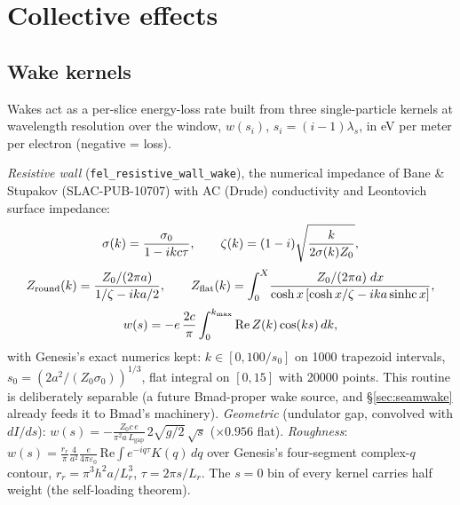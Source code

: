 \documentclass[11pt]{article}
\newcommand{\code}[1]{\texttt{#1}}
\begin{document}
\section{Collective effects}\label{sec:collective}

\subsection{Wake kernels}\label{sec:wakes}

Wakes act as a per-slice energy-loss rate built from three single-particle kernels at
wavelength resolution over the window, $w(s_i)$, $s_i = (i-1)\lambda_s$, in eV per
meter per electron (negative = loss).

\emph{Resistive wall} (\code{fel\_resistive\_wall\_wake}), the numerical impedance of
Bane \& Stupakov (SLAC-PUB-10707) with AC (Drude) conductivity and Leontovich surface
impedance:
\begin{gather}
  \sigma(k) = \frac{\sigma_0}{1 - i k c\tau}, \qquad
  \zeta(k) = (1-i)\sqrt{\frac{k}{2\sigma(k) Z_0}}, \notag\\[2pt]
  Z_{\mathrm{round}}(k) = \frac{Z_0/(2\pi a)}{1/\zeta - i k a/2}, \qquad
  Z_{\mathrm{flat}}(k) = \int_0^{X}\!
     \frac{Z_0/(2\pi a)\; dx}{\cosh x\,[\cosh x/\zeta - i k a\,\mathrm{sinhc}\,x]},
     \label{eq:bszk}\\[2pt]
  w(s) = -e\,\frac{2c}{\pi}\int_0^{k_{\max}} \mathrm{Re}\,Z(k)\cos(k s)\, dk,
  \label{eq:bsws}
\end{gather}
with Genesis's exact numerics kept: $k \in [0, 100/s_0]$ on 1000 trapezoid intervals,
$s_0 = (2a^2/(Z_0\sigma_0))^{1/3}$, flat integral on $[0,15]$ with 20000 points. This
routine is deliberately separable (a future Bmad-proper wake source, and
\S\ref{sec:seamwake} already feeds it to Bmad's machinery). \emph{Geometric} (undulator gap, convolved with
$dI/ds$): $w(s) = -\frac{Z_0 c\, e}{\pi^2 a\, L_{\mathrm{gap}}}\,2\sqrt{g/2}\,\sqrt{s}$
($\times0.956$ flat). \emph{Roughness}: $w(s) = \frac{r_r}{\pi}\frac{4}{a^2}
\frac{e}{4\pi\varepsilon_0}\,\mathrm{Re}\!\int e^{-iq\tau} K(q)\,dq$ over Genesis's
four-segment complex-$q$ contour, $r_r = \pi^3 h^2 a/L_r^3$, $\tau = 2\pi s/L_r$. The
$s{=}0$ bin of every kernel carries half weight (the self-loading theorem).
\end{document}
